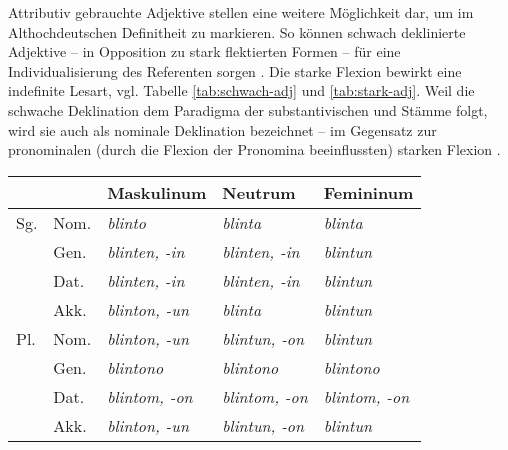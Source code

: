 Attributiv gebrauchte Adjektive stellen eine weitere Möglichkeit dar, um im Althochdeutschen Definitheit zu markieren. So können schwach deklinierte Adjektive -- in Opposition zu stark flektierten Formen -- für eine Individualisierung des Referenten sorgen \parencite[68]{Szczepaniak2011a}. Die starke Flexion bewirkt   eine indefinite Lesart, vgl. Tabelle \ref{tab:schwach-adj} und \ref{tab:stark-adj}.  Weil die schwache Deklination dem Paradigma der substantivischen  und Stämme folgt, wird sie auch als nominale Deklination bezeichnet -- im Gegensatz zur pronominalen  (durch die Flexion der Pronomina beeinflussten)  starken Flexion \parencite[s.][251]{Meineke2001}. 

\begin{table}

\begin{tabular}{lllll}
\lsptoprule
                  &               & \multicolumn{1}{l}{{Maskulinum}}  & \multicolumn{1}{l}{{Neutrum}}     & \multicolumn{1}{l}{{Femininum}}       \\ \midrule
{Sg.} & {Nom.} & \textit{blinto}                          & \textit{blinta}                          & \textit{blinta}                              \\
                  & {Gen.} & \textit{blinten, -in}                    & \textit{blinten, -in}                    & \textit{blintun}                             \\
                  & {Dat.} & \textit{blinten, -in}                    & \textit{blinten, -in}                    & \textit{blintun}                             \\
                  & {Akk.} & \textit{blinton, -un}                    & \textit{blinta}                          & \textit{blintun}                             \\
{Pl.}   & {Nom.} & \textit{blinton, -un}                    & \textit{blintun, -on}                    & \textit{blintun}                             \\
                  & {Gen.} & \textit{blintono}                        & \textit{blintono}                        & \textit{blintono}                            \\
                  & {Dat.} & \textit{blintom, -on}                    & \textit{blintom, -on}                    & \textit{blintom, -on}                        \\
                  & {Akk.} & \textit{blinton, -un}                    & \textit{blintun, -on}                    & \textit{blintun}                             \\\midrule

\end{tabular}
\end{table}
